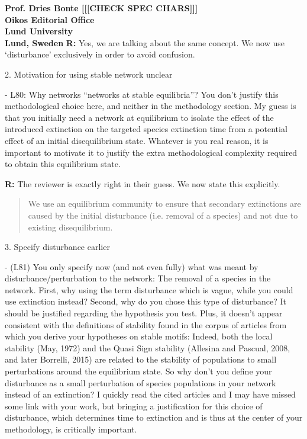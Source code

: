 \documentclass[12pt]{letter}
\begin{document}
\begin{letter}{\bf Prof. Dries Bonte [[[CHECK SPEC CHARS]]]\\
Oikos Editorial Office \\
Lund University \\
Lund, Sweden}
      \textbf{R:} Yes, we are talking about the same concept. We now use `disturbance' exclusively in order to avoid confusion.


    2. Motivation for using stable network unclear

      - L80: Why networks ``networks at stable equilibria''? You don’t justify this methodological choice here, and neither in the methodology section. My guess is that you initially need a network at equilibrium to isolate the effect of the introduced extinction on the targeted species extinction time from a potential effect of an initial disequilibrium state. Whatever is you real reason, it is important to motivate it to justify the extra methodological complexity  required to obtain this equilibrium state.

      \textbf{R:}
      The reviewer is exactly right in their guess. We now state this explicitly.
      
      \begin{quotation}
          We use an equilibrium community to ensure that secondary extinctions are caused by the initial disturbance (i.e. removal of a species) and not due to existing disequilibrium.
      \end{quotation}
      


    3. Specify disturbance earlier

      - (L81) You only specify now (and not even fully) what was meant by disturbance/perturbation to the network: The removal of a species in the network. First, why using the term disturbance which is vague, while you could use extinction instead? Second, why do you chose this type of disturbance? It should be justified regarding the hypothesis you test. Plus, it doesn't appear consistent with the definitions of stability found in the corpus of articles from which you derive your hypotheses on stable motifs: Indeed, both the local stability (May, 1972) and the Quasi Sign stability (Allesina and Pascual, 2008, and later Borrelli, 2015) are related to the stability of populations to small perturbations around the equilibrium state. So why don't you define your disturbance as a small perturbation of species populations in your network instead of an extinction? I quickly read the cited articles and I may have missed some link with your work, but bringing a justification for this choice of disturbance, which determines time to extinction and is thus at the center of your methodology, is critically important.


\end{letter}
\end{document}
